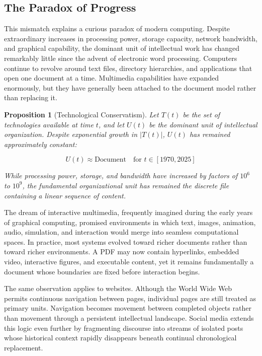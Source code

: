 \documentclass[12pt,oneside]{article}
\newtheorem{proposition}[definition]{Proposition}
\theoremstyle{remark}
\begin{document}
\subsection{The Paradox of Progress}

This mismatch explains a curious paradox of modern computing. Despite extraordinary increases in processing power, storage capacity, network bandwidth, and graphical capability, the dominant unit of intellectual work has changed remarkably little since the advent of electronic word processing. Computers continue to revolve around text files, directory hierarchies, and applications that open one document at a time. Multimedia capabilities have expanded enormously, but they have generally been attached to the document model rather than replacing it.

\begin{proposition}[Technological Conservatism]
Let $T(t)$ be the set of technologies available at time $t$, and let $U(t)$ be the dominant unit of intellectual organization. Despite exponential growth in $|T(t)|$, $U(t)$ has remained approximately constant:

\begin{equation}
U(t) \approx \text{Document} \quad \text{for } t \in [1970, 2025]
\end{equation}

While processing power, storage, and bandwidth have increased by factors of $10^6$ to $10^9$, the fundamental organizational unit has remained the discrete file containing a linear sequence of content.
\end{proposition}

The dream of interactive multimedia, frequently imagined during the early years of graphical computing, promised environments in which text, images, animation, audio, simulation, and interaction would merge into seamless computational spaces. In practice, most systems evolved toward richer documents rather than toward richer environments. A PDF may now contain hyperlinks, embedded video, interactive figures, and executable content, yet it remains fundamentally a document whose boundaries are fixed before interaction begins.

The same observation applies to websites. Although the World Wide Web permits continuous navigation between pages, individual pages are still treated as primary units. Navigation becomes movement between completed objects rather than movement through a persistent intellectual landscape. Social media extends this logic even further by fragmenting discourse into streams of isolated posts whose historical context rapidly disappears beneath continual chronological replacement.
\end{document}
